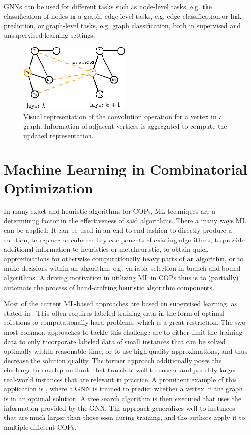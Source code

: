 \documentclass[draft,final]{vutinfth} %
\begin{document}
GNNs can be used for different tasks such as node-level tasks, e.g. the classification of nodes in a graph, edge-level tasks, e.g. edge classification or link prediction, or graph-level tasks, e.g. graph classification, both in supervised and unsupervised learning settings. 

\begin{figure}
    \centering
    \includegraphics[width=0.5\textwidth]{graphics/gnn-conv.eps}
    \caption{Visual representation of the convolution operation for a vertex in a graph. Information of adjacent vertices is aggregated to compute the updated representation.}
    \label{fig:conv-gnn}
\end{figure}

\section{Machine Learning in Combinatorial Optimization}\label{sec:ml-co}

In many exact and heuristic algorithms for COPs, ML techniques are a determining factor in the effectiveness of said algorithms. There a many ways ML can be applied: It can be used in an end-to-end fashion to directly produce a solution, to replace or enhance key components of existing algorithms, to provide additional information to heuristics or metaheuristic, to obtain quick approximations for otherwise computationally heavy parts of an algorithm, or to make decisions within an algorithm, e.g. variable selection in branch-and-bound algorithms. A driving motivation in utilizing ML in COPs thus is to (partially) automate the process of hand-crafting heuristic algorithm components. 

Most of the current ML-based approaches are based on supervised learning, as stated in \cite{Cappart2021}. This often requires labeled training data in the form of optimal solutions to computationally hard problems, which is a great restriction. 
The two most common approaches to tackle this challenge are to either limit the training data to only incorporate labeled data of small instances that can be solved optimally within reasonable time, or to use high quality approximations, and thus decrease the solution quality. The former approach additionally poses the challenge to develop methods that translate well to unseen and possibly larger real-world instances that are relevant in practice. 
A prominent example of this application is \cite{Li2018}, where a GNN is trained to predict whether a vertex in the graph is in an optimal solution. A tree search algorithm is then executed that uses the information provided by the GNN. The approach generalizes well to instances that are much larger than those seen during training, and the authors apply it to multiple different COPs. 
\end{document}
